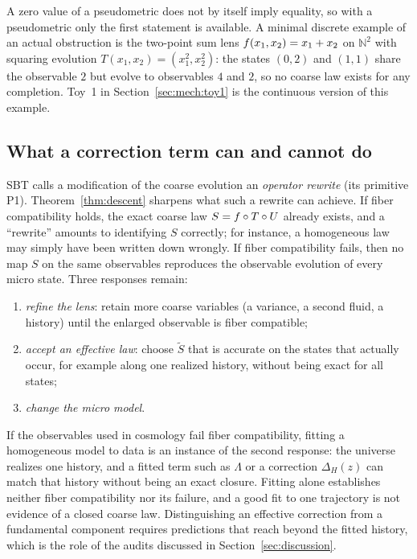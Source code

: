 \documentclass[11pt]{article}
\theoremstyle{plain}
\theoremstyle{definition}
\theoremstyle{remark}
\begin{document}
A zero value of a pseudometric does not by itself imply equality, so with a pseudometric only the first statement is available. A minimal discrete example of an actual obstruction is the two-point sum lens $f(x_1,x_2)=x_1+x_2$ on $\mathbb{N}^2$ with squaring evolution $T(x_1,x_2)=(x_1^2,x_2^2)$: the states $(0,2)$ and $(1,1)$ share the observable $2$ but evolve to observables $4$ and $2$, so no coarse law exists for any completion. Toy~1 in Section~\ref{sec:mech:toy1} is the continuous version of this example.

\subsection{What a correction term can and cannot do}\label{sec:framework:rewrite}

SBT calls a modification of the coarse evolution an \emph{operator rewrite} (its primitive P1). Theorem~\ref{thm:descent} sharpens what such a rewrite can achieve. If fiber compatibility holds, the exact coarse law $S=f\circ T\circ U$ already exists, and a ``rewrite'' amounts to identifying $S$ correctly; for instance, a homogeneous law may simply have been written down wrongly. If fiber compatibility fails, then no map $S$ on the same observables reproduces the observable evolution of every micro state. Three responses remain:
\begin{enumerate}
  \item \emph{refine the lens}: retain more coarse variables (a variance, a second fluid, a history) until the enlarged observable is fiber compatible;
  \item \emph{accept an effective law}: choose $\widetilde S$ that is accurate on the states that actually occur, for example along one realized history, without being exact for all states;
  \item \emph{change the micro model}.
\end{enumerate}
If the observables used in cosmology fail fiber compatibility, fitting a homogeneous model to data is an instance of the second response: the universe realizes one history, and a fitted term such as $\Lambda$ or a correction $\Delta_H(z)$ can match that history without being an exact closure. Fitting alone establishes neither fiber compatibility nor its failure, and a good fit to one trajectory is not evidence of a closed coarse law. Distinguishing an effective correction from a fundamental component requires predictions that reach beyond the fitted history, which is the role of the audits discussed in Section~\ref{sec:discussion}.
\end{document}
